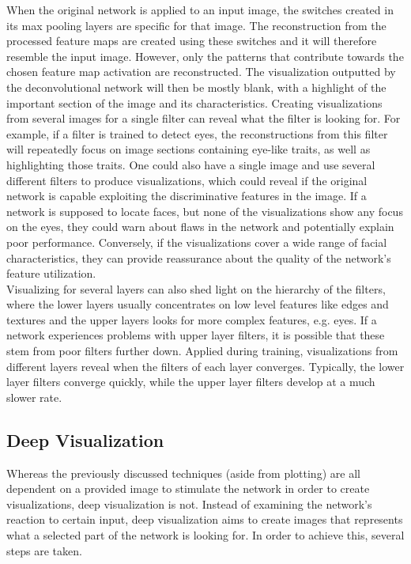 \noindent When the original network is applied to an input image, the switches created in its max pooling layers are specific for that image. The reconstruction from the processed feature maps are created using these switches and it will therefore resemble the input image. However, only the patterns that contribute towards the chosen feature map activation are reconstructed. The visualization outputted by the deconvolutional network will then be mostly blank, with a highlight of the important section of the image and its characteristics. Creating visualizations from several images for a single filter can reveal what the filter is looking for. For example, if a filter is trained to detect eyes, the reconstructions from this filter will repeatedly focus on image sections containing eye-like traits, as well as highlighting those traits. One could also have a single image and use several different filters to produce visualizations, which could reveal if the original network is capable exploiting the discriminative features in the image. If a network is supposed to locate faces, but none of the visualizations show any focus on the eyes, they could warn about flaws in the network and potentially explain poor performance. Conversely, if the visualizations cover a wide range of facial characteristics, they can provide reassurance about the quality of the network's feature utilization. \\

\noindent Visualizing for several layers can also shed light on the hierarchy of the filters, where the lower layers usually concentrates on low level features like edges and textures and the upper layers looks for more complex features, e.g. eyes. If a network experiences problems with upper layer filters, it is possible that these stem from poor filters further down. Applied during training, visualizations from different layers reveal when the filters of each layer converges. Typically, the lower layer filters converge quickly, while the upper layer filters develop at a much slower rate.


\subsection{Deep Visualization}

Whereas the previously discussed techniques (aside from plotting) are all dependent on a provided image to stimulate the network in order to create visualizations, deep visualization is not. Instead of examining the network's reaction to certain input, deep visualization aims to create images that represents what a selected part of the network is looking for. In order to achieve this, several steps are taken. \\

